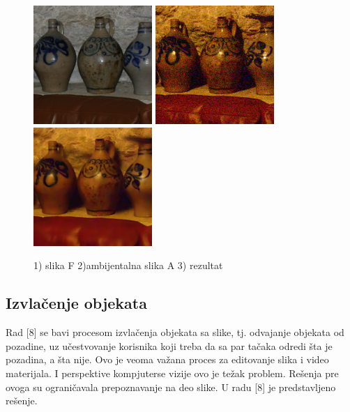 \documentclass[a4paper,12pt,titlepage]{article}
\begin{document}
\begin{figure}[ht!]
\centering
\includegraphics[width=45mm]{img/flashF.png}
\includegraphics[width=45mm]{img/flashA.png}
\includegraphics[width=45mm]{img/flashR.png}
\caption{1) slika F 2)ambijentalna slika A 3) rezultat}
\label{overflow}
\end{figure} 

\subsection{Izvlačenje objekata}%

Rad [8] se bavi procesom izvlačenja objekata sa slike, tj. odvajanje objekata od pozadine, uz učestvovanje korisnika koji treba da sa par tačaka odredi šta je pozadina, a šta nije. Ovo je veoma važana proces za editovanje slika i video materijala. I perspektive kompjuterse vizije ovo je težak problem. Rešenja pre ovoga su ograničavala prepoznavanje na deo slike. U radu [8] je predstavljeno rešenje.  
\end{document}

